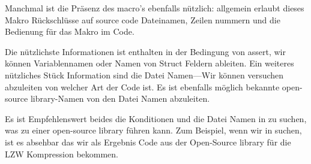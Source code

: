 
Manchmal ist die Pr\"asenz des  macro's ebenfalls n\"utzlich:
allgemein erlaubt dieses Makro R\"uckschl\"usse auf source code Dateinamen,
Zeilen nummern und die Bedienung f\"ur das Makro im Code.

Die n\"utzlichste Informationen ist enthalten in der Bedingung von assert, wir k\"onnen Variablennamen oder Namen
von Struct Feldern ableiten. Ein weiteres n\"utzliches St\"uck Information sind die Datei Namen---Wir k\"onnen versuchen
abzuleiten von welcher Art der Code ist. 
Es ist ebenfalls m\"oglich bekannte open-source library-Namen von den Datei Namen abzuleiten.



Es ist Empfehlenswert beides die Konditionen und die Datei Namen in  zu suchen, was zu einer open-source library f\"uhren kann. 
Zum Beispiel, wenn wir  in  suchen, ist es absehbar das wir als Ergebnis Code aus der 
Open-Source library f\"ur die LZW Kompression bekommen. 
